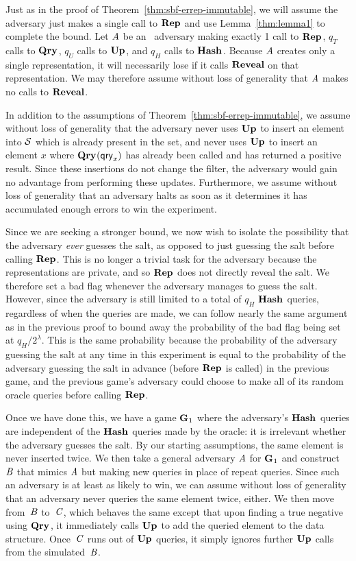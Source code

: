 Just as in the proof of Theorem~\ref{thm:sbf-errep-immutable}, we will assume
the adversary just makes a single call to $\textup{\textbf{Rep}}\hspace{0.5pt}$ and use Lemma~\ref{thm:lemma1}
to complete the bound. Let $\mathit{A}$ be an \erreps\ adversary making exactly 1
call to $\textup{\textbf{Rep}}\hspace{0.5pt}$, $q_T$ calls to $\textup{\textbf{Qry}}\hspace{0.5pt}$, $q_U$ calls to $\textup{\textbf{Up}}\hspace{0.5pt}$, and $q_H$ calls
to $\textup{\textbf{Hash}}\hspace{0.5pt}$. Because $\mathit{A}$ creates only a single representation, it will
necessarily lose if it calls $\mathbf{Reveal}$ on that representation. We may therefore
assume without loss of generality that $\mathit{A}$ makes no calls to $\mathbf{Reveal}$.

In addition to the assumptions of Theorem~\ref{thm:sbf-errep-immutable}, we
assume without loss of generality that the adversary never uses $\textup{\textbf{Up}}\hspace{0.5pt}$ to insert
an element into $\mathcal{S}$ which is already present in the set, and never uses
$\textup{\textbf{Up}}\hspace{0.5pt}$ to insert an element $x$ where $\textup{\textbf{Qry}}\hspace{0.5pt}(\mathsf{qry}_x)$ has already been called
and has returned a positive result. Since these insertions do not change the
filter, the adversary would gain no advantage from performing these updates.
Furthermore, we assume without loss of generality that an adversary halts as
soon as it determines it has accumulated enough errors to win the experiment.

Since we are seeking a stronger bound, we now wish to isolate the possibility
that the adversary \emph{ever} guesses the salt, as opposed to just guessing the
salt before calling $\textup{\textbf{Rep}}\hspace{0.5pt}$. This is no longer a trivial task for the adversary
because the representations are private, and so $\textup{\textbf{Rep}}\hspace{0.5pt}$ does not directly reveal
the salt. We therefore set a bad flag whenever the adversary manages to guess
the salt. However, since the adversary is still limited to a total of $q_H$
$\textup{\textbf{Hash}}\hspace{0.5pt}$ queries, regardless of when the queries are made, we can follow nearly
the same argument as in the previous proof to bound away the probability of the
bad flag being set at $q_H/2^\lambda$. This is the same probability because the
probability of the adversary guessing the salt at any time in this experiment is
equal to the probability of the adversary guessing the salt in advance (before
$\textup{\textbf{Rep}}\hspace{0.5pt}$ is called) in the previous game, and the previous game's adversary could
choose to make all of its random oracle queries before calling $\textup{\textbf{Rep}}\hspace{0.5pt}$.

Once we have done this, we have a game $\textup{\textbf{G}}\hspace{0.5pt}_1$ where the adversary's $\textup{\textbf{Hash}}\hspace{0.5pt}$
queries are independent of the $\textup{\textbf{Hash}}\hspace{0.5pt}$ queries made by the oracle: it is
irrelevant whether the adversary guesses the salt.
%
By our starting assumptions, the same element is
never inserted twice. We then take a general adversary $\mathit{A}$ for $\textup{\textbf{G}}\hspace{0.5pt}_1$ and
construct $\mathit{B}$ that mimics $\mathit{A}$ but making new queries in place of repeat
queries. Since such an adversary is at least as likely to win, we can assume
without loss of generality that an adversary never queries the same element
twice, either. We then move from~$\mathit{B}$ to~$\mathit{C}$, which behaves the same
except that upon finding a true negative using $\textup{\textbf{Qry}}\hspace{0.5pt}$, it immediately calls
$\textup{\textbf{Up}}\hspace{0.5pt}$ to add the queried element to the data structure. Once~$\mathit{C}$ runs out
of $\textup{\textbf{Up}}\hspace{0.5pt}$ queries, it simply ignores further $\textup{\textbf{Up}}\hspace{0.5pt}$ calls from the
simulated~$\mathit{B}$.

